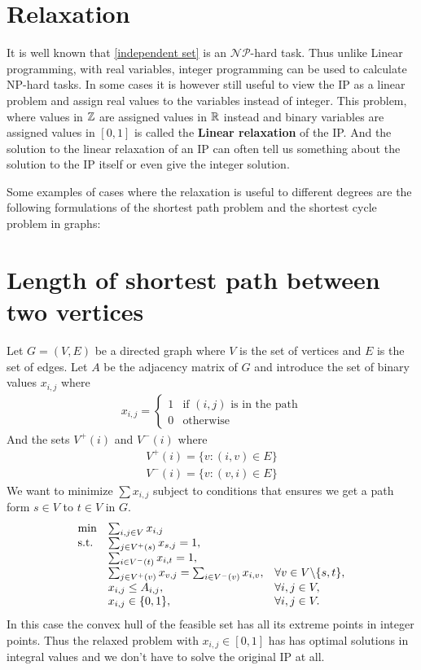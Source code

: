 \section{Relaxation}
It is well known that \ref{independent set} is an $\mathcal{NP}$-hard task. Thus unlike Linear programming, with real variables, integer programming can be used to calculate NP-hard tasks. In some cases it is however still useful to view the IP as a linear problem and assign real values to the variables instead of integer. This problem, where values in $\mathbb{Z}$ are assigned values in $\mathbb{R}$ instead and binary variables are assigned values in $[0,1]$ is called the \textbf{Linear relaxation} of the IP. And the solution to the linear relaxation of an IP can often tell us something about the solution to the IP itself or even give the integer solution.
\begin{example}
Some examples of cases where the relaxation is useful to different degrees are the following formulations of the shortest path problem and the shortest cycle problem in graphs:
\section{Length of shortest path between two vertices}
Let $G=(V,E)$ be a directed graph where $V$ is the set of vertices and $E$ is the set of edges. Let $A$ be the adjacency matrix of $G$ and introduce the set of binary values $x_{i,j}$ where
\begin{align*}
x_{i,j} = \left\{
\begin{array}{ll}
1 & \text{if } (i,j) \text{ is in the path} \\ 0 & \text{otherwise}
\end{array}\right.
\end{align*}
And the sets $V^+(i)$ and $V^-(i)$ where
\begin{align*}
V^+(i) = \{v: (i,v) \in E\}\\
V^-(i) = \{v: (v, i) \in E\}
\end{align*}
We want to minimize $\sum x_{i,j}$ subject to conditions that ensures we get a path form $s \in V$ to $t \in V$ in $G$.
\begin{align}
\begin{array}{ll@{}ll}
\text{min} &\sum_{i,j \in V}x_{i,j}&\\
\text{s.t.} &\sum_{j\in V^+(s)}x_{s,j} = 1,&\\
&\sum_{i\in V^-(t)}x_{i,t} = 1,&\\
&\sum_{j\in V^+(v)}x_{v,j} = \sum_{i\in V^-(v)}x_{i,v}, \quad &\forall v \in V \backslash \{s,t\},\\
&x_{i,j}\leq A_{i,j},&\forall i,j \in V,\\
&x_{i,j} \in \{0,1\},&\forall i,j \in V.\\
\end{array}
\end{align}
In this case the convex hull of the feasible set has all its extreme points in integer points. Thus the relaxed problem with $x_{i,j} \in [0,1]$ has has optimal solutions in integral values and we don't have to solve the original IP at all.\\

\end{example}
